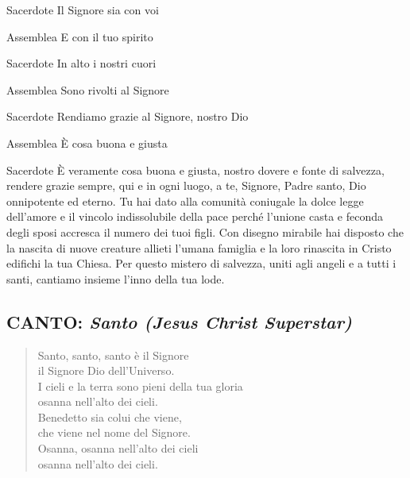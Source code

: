 \begin{dialoghi}
\item[Sacerdote] Il Signore sia con voi
\item[Assemblea] E con il tuo spirito
\item[Sacerdote] In alto i nostri cuori
\item[Assemblea] Sono rivolti al Signore
\item[Sacerdote] Rendiamo grazie al Signore, nostro Dio
\item[Assemblea] È cosa buona e giusta
\item[Sacerdote] È veramente cosa buona e giusta, nostro dovere e fonte di salvezza, rendere grazie sempre, qui e in ogni luogo, a te, Signore, Padre santo, Dio onnipotente ed eterno. Tu hai dato alla comunità coniugale la dolce legge dell'amore e il vincolo indissolubile della pace perché l'unione casta e feconda degli sposi accresca il numero dei tuoi figli. Con disegno mirabile hai disposto che la nascita di nuove creature allieti l'umana famiglia e la loro rinascita in Cristo edifichi la tua Chiesa. Per questo mistero di salvezza, uniti agli angeli e a tutti i santi, cantiamo insieme l'inno della tua lode.
\end{dialoghi}

\subsection*{CANTO: \textit{Santo (Jesus Christ Superstar)}}

\begin{verse}
\begin{mystrofe}
Santo, santo, santo è il Signore \\
il Signore Dio dell'Universo. \\
I cieli e la terra sono pieni della tua gloria \\
osanna nell'alto dei cieli. \\
Benedetto sia colui che viene, \\
che viene nel nome del Signore. \\
Osanna, osanna nell'alto dei cieli \\
osanna nell'alto dei cieli.
\end{mystrofe}
\end{verse}

